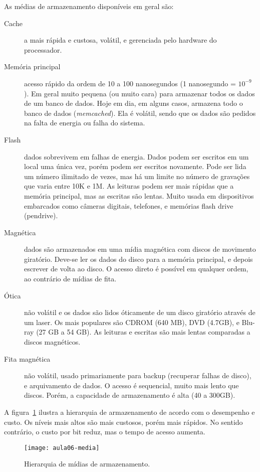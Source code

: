 As médias de armazenamento disponíveis em geral são:
\begin{description}
\item[Cache] a mais rápida e custosa, volátil, e gerenciada pelo hardware
do processador.

\item[Memória principal] acesso rápido da ordem de 10 a 100 nanosegundos (1 nanosegundo = $10^{-9}$).
Em geral muito pequena (ou muito cara) para armazenar todos os dados de um banco de dados.
Hoje  em dia, em alguns casos, armazena todo o banco de dados (\emph{memcached}).
Ela é volátil, sendo que os dados são pedidos na falta de energia ou falha do sistema.

\item[Flash] dados sobrevivem em falhas de energia. Dados podem ser escritos em um local
uma única vez, porém podem ser escritos novamente.
Pode ser lida um número ilimitado de vezes, mas há um limite no  número de gravações
que varia entre 10K e 1M.
As leituras podem ser mais rápidas que a memória principal, mas as escritas
são lentas.
Muito usada em dispositivos embarcados como câmeras digitais, 
telefones, e memórias flash drive (pendrive).

\item[Magnética] dados são armazenados em uma mídia magnética com discos de movimento
giratório. 
Deve-se ler os dados do disco para a memória principal, e depois escrever de volta ao disco.
O acesso direto é possível em qualquer ordem, ao contrário de mídias de fita.


\item[Ótica] não volátil e os dados são lidos óticamente de um disco 
giratório através de um laser.
Os mais populares são CDROM (640 MB), DVD (4.7GB), e Blu-ray (27 GB a 54 GB).
As leituras e escritas são mais lentas comparadas a discos magnéticos.

\item[Fita magnética]
não volátil, usado primariamente para backup (recuperar falhas de disco), e 
arquivamento de dados.
O acesso é sequencial, muito mais lento que discos. Porém, a capacidade
de armazenamento é alta (40 a 300GB).
\end{description}

A figura~\ref{aula06:fig:media} ilustra a hierarquia de armazenamento de acordo com 
o desempenho e custo.
Os níveis mais altos são mais custosos, porém mais rápidos.
No sentido contrário, o custo por bit reduz, mas o tempo de acesso aumenta.
%
\begin{figure}[!htb]
\centering
\texttt{[image: aula06-media]}
\caption{Hierarquia de mídias de armazenamento.}
\label{aula06:fig:media}
\end{figure}

